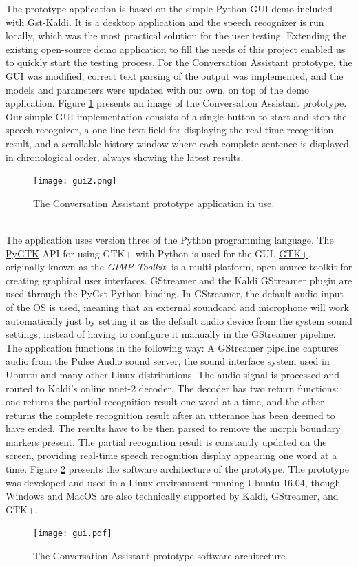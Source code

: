 \documentclass[english, 12pt, a4paper, pdftex, elec, utf8]{aaltothesis}
\begin{document}
The prototype application is based on the simple Python GUI demo included with Gst-Kaldi. It is a desktop application and the speech recognizer is run locally, which was the most practical solution for the user testing. Extending the existing open-source demo application to fill the needs of this project enabled us to quickly start the testing process. For the Conversation Assistant prototype, the GUI was modified, correct text parsing of the output was implemented, and the models and parameters were updated with our own, on top of the demo application. Figure \ref{fig:gui} presents an image of the Conversation Assistant prototype. 
Our simple GUI implementation consists of a single button to start and stop the speech recognizer, a one line text field for displaying the real-time recognition result, and a scrollable history window where each complete sentence is displayed in chronological order, always showing the latest results. \\
\begin{figure}[h]
	\centering
	\texttt{[image: gui2.png]}
	\caption{The Conversation Assistant prototype application in use.}
	\label{fig:gui} 
\end{figure} \\
The application uses version three of the Python programming language. The \href{http://www.pygtk.org/}{PyGTK} API for using GTK+ with Python is used for the GUI. \href{https://www.gtk.org/}{GTK+}, originally known as the \textit{GIMP Toolkit}, is a multi-platform, open-source toolkit for creating graphical user interfaces. GStreamer and the Kaldi GStreamer plugin are used through the PyGst Python binding. In GStreamer, the default audio input of the OS is used, meaning that an external soundcard and microphone will work automatically just by setting it as the default audio device from the system sound settings, instead of having to configure it manually in the GStreamer pipeline. The application functions in the following way: A GStreamer pipeline captures audio from the Pulse Audio sound server, the sound interface system used in Ubuntu and many other Linux distributions. The audio signal is processed and routed to Kaldi's online nnet-2 decoder. The decoder has two return functions: one returns the partial recognition result one word at a time, and the other returns the complete recognition result after an utterance has been deemed to have ended. The results have to be then parsed to remove the morph boundary markers present. The partial recognition result is constantly updated on the screen, providing real-time speech recognition display appearing one word at a time. Figure \ref{fig:python} presents the software architecture of the prototype. The prototype was developed and used in a Linux environment running Ubuntu 16.04, though Windows and MacOS are also technically supported by Kaldi, GStreamer, and GTK+.
\begin{figure}[t]
	\centering
	\texttt{[image: gui.pdf]}
	\caption{The Conversation Assistant prototype software architecture.}
	\label{fig:python} 
\end{figure}
\end{document}
